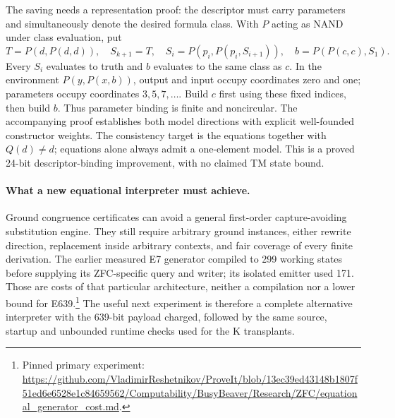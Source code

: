 The saving needs a representation proof: the descriptor must carry
parameters and simultaneously denote the desired formula class.
With $P$ acting as NAND under class evaluation, put
\[
 T=P(d,P(d,d)),\quad S_{k+1}=T,\quad
 S_i=P(p_i,P(p_i,S_{i+1})),\quad b=P(P(c,c),S_1).
\]
Every $S_i$ evaluates to truth and $b$ evaluates to the same class as $c$.
In the environment $P(y,P(x,b))$, output and input occupy coordinates
zero and one; parameters occupy coordinates $3,5,7,\ldots$.
Build $c$ first using these fixed indices, then build $b$.  Thus parameter
binding is finite and noncircular.  The accompanying proof establishes
both model directions with explicit well-founded constructor weights.
The consistency target is the equations together with $Q(d)\ne d$;
equations alone always admit a one-element model.  This is a proved
24-bit descriptor-binding improvement, with no claimed TM state bound.

\paragraph{What a new equational interpreter must achieve.}
Ground congruence certificates can avoid a general first-order
capture-avoiding substitution engine.  They still require arbitrary
ground instances, either rewrite direction, replacement inside arbitrary
contexts, and fair coverage of every finite derivation.  The earlier
measured E7 generator compiled to 299 working states before supplying
its ZFC-specific query and writer; its isolated emitter used 171.
Those are costs of that particular architecture, neither a compilation
nor a lower bound for E639.\footnote{Pinned primary experiment:
\url{https://github.com/VladimirReshetnikov/ProveIt/blob/13ec39ed43148b1807f51ed6e6528e1c84659562/Computability/BusyBeaver/Research/ZFC/equational_generator_cost.md}.}
The useful next experiment is therefore a complete alternative interpreter
with the 639-bit payload charged, followed by the same source, startup and
unbounded runtime checks used for the K transplants.
